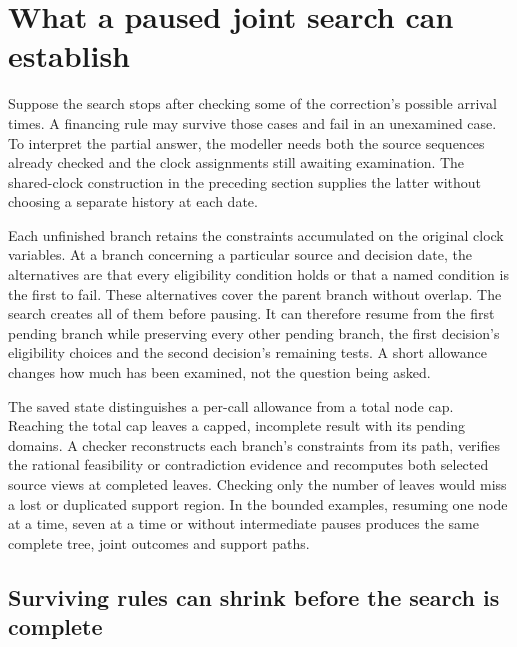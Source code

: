\section{What a paused joint search can establish}
\label{sim:joint-source-frontier}

Suppose the search stops after checking some of the correction's possible arrival times. A financing rule may survive those cases and fail in an unexamined case. To interpret the partial answer, the modeller needs both the source sequences already checked and the clock assignments still awaiting examination. The shared-clock construction in the preceding section supplies the latter without choosing a separate history at each date.

Each unfinished branch retains the constraints accumulated on the original clock variables. At a branch concerning a particular source and decision date, the alternatives are that every eligibility condition holds or that a named condition is the first to fail. These alternatives cover the parent branch without overlap. The search creates all of them before pausing. It can therefore resume from the first pending branch while preserving every other pending branch, the first decision's eligibility choices and the second decision's remaining tests. A short allowance changes how much has been examined, not the question being asked.

The saved state distinguishes a per-call allowance from a total node cap. Reaching the total cap leaves a capped, incomplete result with its pending domains. A checker reconstructs each branch's constraints from its path, verifies the rational feasibility or contradiction evidence and recomputes both selected source views at completed leaves. Checking only the number of leaves would miss a lost or duplicated support region. In the bounded examples, resuming one node at a time, seven at a time or without intermediate pauses produces the same complete tree, joint outcomes and support paths.

\subsection{Surviving rules can shrink before the search is complete}

